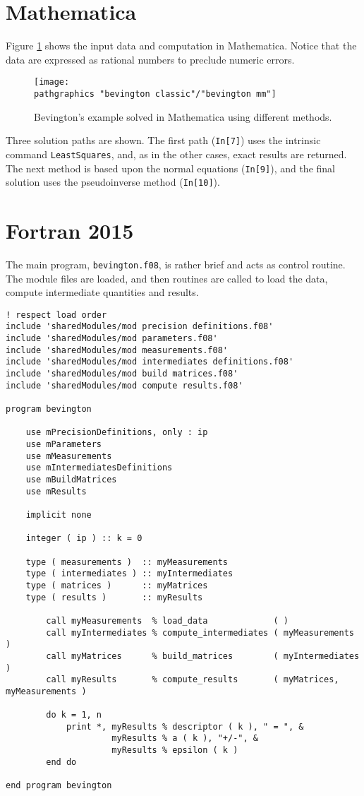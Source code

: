 \section{Mathematica}  %
Figure \ref{fig:bevington mm} shows the input data and computation in Mathematica. Notice that the data are expressed as rational numbers to preclude numeric errors.

\begin{figure}[htbp] %
   \texttt{[image: \\pathgraphics "bevington classic"/"bevington mm"]} 
   \caption{Bevington's example solved in Mathematica using different methods.}
   \label{fig:bevington mm}
\end{figure}

Three solution paths are shown. The first path (\texttt{In[7]}) uses the intrinsic command \texttt{LeastSquares}, and, as in the other cases, exact results are returned. The next method is based upon the normal equations (\texttt{In[9]}), and the final solution uses the pseudoinverse method (\texttt{In[10]}).

\section{Fortran 2015}  %
The main program, \texttt{bevington.f08}, is rather brief and acts as control routine. The module files are loaded, and then routines are called to load the data, compute intermediate quantities and results.
\begin{lstlisting}
! respect load order
include 'sharedModules/mod precision definitions.f08'
include 'sharedModules/mod parameters.f08'
include 'sharedModules/mod measurements.f08'
include 'sharedModules/mod intermediates definitions.f08'
include 'sharedModules/mod build matrices.f08'
include 'sharedModules/mod compute results.f08'

program bevington

    use mPrecisionDefinitions, only : ip
    use mParameters
    use mMeasurements
    use mIntermediatesDefinitions
    use mBuildMatrices
    use mResults

    implicit none

    integer ( ip ) :: k = 0

    type ( measurements )  :: myMeasurements
    type ( intermediates ) :: myIntermediates
    type ( matrices )      :: myMatrices
    type ( results )       :: myResults

        call myMeasurements  % load_data             ( )
        call myIntermediates % compute_intermediates ( myMeasurements )
        call myMatrices      % build_matrices        ( myIntermediates )
        call myResults       % compute_results       ( myMatrices, myMeasurements )

        do k = 1, n
            print *, myResults % descriptor ( k ), " = ", &
                     myResults % a ( k ), "+/-", &
                     myResults % epsilon ( k )
        end do

end program bevington
\end{lstlisting}

